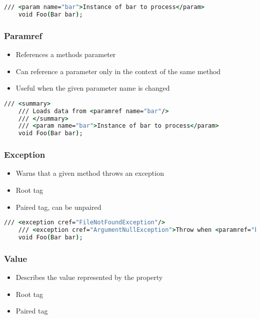 \begin{lstlisting}[language=csh]
    /// <param name="bar">Instance of bar to process</param>
    void Foo(Bar bar);
\end{lstlisting}

\subsubsection*{Paramref}
\begin{itemize}
    \item References a methods parameter
    \item Can reference a parameter only in the context of the same method
    \item Useful when the given parameter name is changed
\end{itemize}

\begin{lstlisting}[language=csh]
    /// <summary>
    /// Loads data from <paramref name="bar"/>
    /// </summary>
    /// <param name="bar">Instance of bar to process</param>
    void Foo(Bar bar);
\end{lstlisting}

\subsubsection*{Exception}
\begin{itemize}
    \item Warns that a given method throws an exception
    \item Root tag
    \item Paired tag, can be unpaired
\end{itemize}

\begin{lstlisting}[language=csh]
    /// <exception cref="FileNotFoundException"/>
    /// <exception cref="ArgumentNullException">Throw when <paramref="bar"/> is found to be <c>null</c></exception>
    void Foo(Bar bar);
\end{lstlisting}

\subsubsection*{Value}
\begin{itemize}
    \item Describes the value represented by the property
    \item Root tag
    \item Paired tag
\end{itemize}

